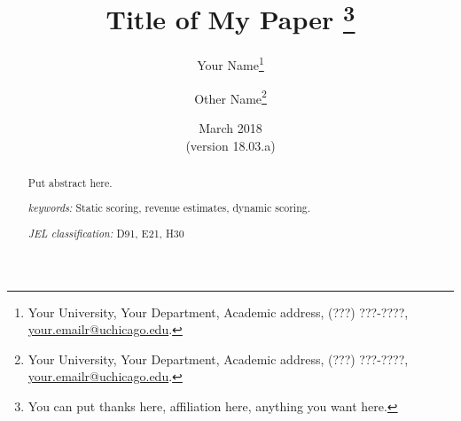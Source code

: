 \documentclass[letterpaper,12pt]{article}
\theoremstyle{definition}
\begin{document}
\begin{titlepage}
\title{Title of My Paper \thanks{You can put thanks here, affiliation here, anything you want here.}
       }
       \author{
  Your Name\footnote{Your University, Your Department, Academic address, (???) ???-????, \href{mailto:your.emailr@uchicago.edu}{your.emailr@uchicago.edu}.} \\[-2pt]
  \and
  Other Name\footnote{Your University, Your Department, Academic address, (???) ???-????, \href{mailto:your.emailr@uchicago.edu}{your.emailr@uchicago.edu}.}}
\date{March 2018 \\
  \scriptsize{(version 18.03.a)}}
\maketitle
\vspace{-9mm}
\begin{abstract}
\small{Put abstract here.
\vspace{3mm}

\noindent\textit{keywords:}\: Static scoring, revenue estimates, dynamic scoring.

\vspace{3mm}

\noindent\textit{JEL classification:} D91, E21, H30
}

\end{abstract}
\thispagestyle{empty}
\end{titlepage}
\end{document}
